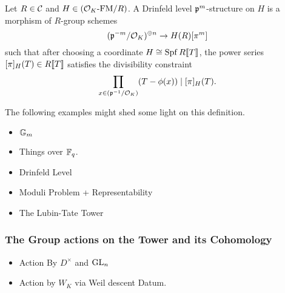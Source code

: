 \label{subsub:Deformations of Formal Modules with Drinfeld Level Structure}
\begin{defi}
  Let $R \in \mathcal{C}$ and $H \in {({\mathcal{O}_K}\text-\mathrm{FM}/{R})}$. A Drinfeld level 
  $\mathfrak{p}^m$-structure on $H$ is a morphism of $R$-group schemes 
  \begin{equation*}
    (\mathfrak{p}^{-m}/\mathcal{O}_K)^{\oplus n} \to H(R)[\pi^m]
  \end{equation*}
  such that after choosing a coordinate $H \cong \operatorname{Spf} R\llbracket T \rrbracket$, the 
  power series $[\pi]_H(T) \in R\llbracket T \rrbracket$ satisfies the divisibility constraint
  \begin{equation*}
    \prod_{x \in (\mathfrak{p}^{-1}/\mathcal{O}_K)}(T - \phi(x)) \mid  [\pi]_H(T).
  \end{equation*}
\end{defi}
The following examples might shed some light on this definition.
\begin{xpl}
  \begin{itemize}
    \item $\mathbb{G}_m$
    \item Things over $\mathbb{F}_q$.
  \end{itemize}
\end{xpl}

\begin{itemize}
  \item Drinfeld Level
  \item Moduli Problem + Representability
  \item The Lubin-Tate Tower
\end{itemize}

\subsubsection{The Group actions on the Tower and its Cohomology} %
\label{subsub:The Group actions on the Tower}
\begin{itemize}
  \item Action By $D^\times$ and $\operatorname{GL}_n$
  \item Action by $W_K$ via Weil descent Datum.
\end{itemize}
